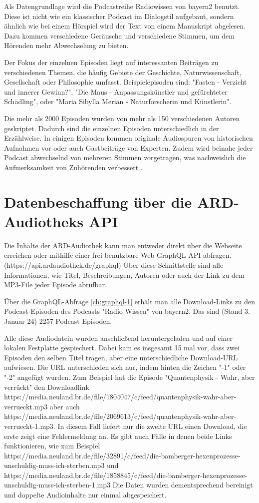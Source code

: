 Als Datengrundlage wird die Podcastreihe Radiowissen von bayern2 benutzt. 
Diese ist nicht wie ein klassischer Podcast im Dialogstil aufgebaut, sondern ähnlich wie bei einem Hörspiel wird der Text von einem Manuskript abgelesen. 
Dazu kommen verschiedene Geräusche und verschiedene Stimmen, um dem Hörenden mehr Abwechselung zu bieten.

Der Fokus der einzelnen Episoden liegt auf interessanten Beiträgen zu verschiedenen Themen, die häufig Gebiete der Geschichte, Naturwissenschaft, Gesellschaft oder Philosophie umfasst.
Beispielepisoden sind: "Fasten - Verzicht und innerer Gewinn?", "Die Maus - Anpassungskünstler und gefürchteter Schädling", oder "Maria Sibylla Merian - Naturforscherin und Künstlerin".

Die mehr als 2000 Episoden wurden von mehr als 150 verschiedenen Autoren geskriptet.
Dadurch sind die einzelnen Episoden unterschiedlich in der Erzählweise.
In einigen Episoden kommen originale Audiospuren von historischen Aufnahmen vor oder auch  Gastbeiträge von Experten. Zudem wird beinahe jeder Podcast abwechselnd von mehreren Stimmen vorgetragen, was nachweislich die Aufmerksamkeit von Zuhörenden verbessert \cite{kang2012}.

\section{Datenbeschaffung über die ARD-Audiotheks API}

Die Inhalte der ARD-Audiothek kann man entweder direkt über die Webseite erreichen oder mithilfe einer frei benutzbare Web-GraphQL API abfragen.
(https://api.ardaudiothek.de/graphql) 
Über diese Schnittstelle sind alle Informationen, wie Titel, Beschreibungen, Autoren oder auch der Link zu dem MP3-File jeder Episode abrufbar.

Über die GraphQL-Abfrage \autoref{ch:graphql-1} erhält man alle Download-Links zu den Podcast-Episoden des Podcasts "Radio Wissen" von bayern2.
Das sind (Stand 3. Januar 24) 2257 Podcast Episoden.

Alle diese Audiodatein wurden anschließend heruntergeladen und auf einer lokalen Festplatte gespiechert.
Dabei kam es insgesamt 15 mal vor, dass zwei Episoden den selben Titel tragen, aber eine unterschiedliche Download-URL aufwiesen.
Die URL unterschieden sich nur, indem hinten die Zeichen "-1" oder "-2" angefügt wurden.
Zum Beispiel hat die Episode "Quantenphysik - Wahr, aber verrückt" den Downloadlink https://media.neuland.br.de/file/1804047/c/feed/quantenphysik-wahr-aber-verrueckt.mp3 aber auch https://media.neuland.br.de/file/2069613/c/feed/quantenphysik-wahr-aber-verrueckt-1.mp3.
In diesem Fall liefert nur die zweite URL einen Download, die erste zeigt eine Fehlermeldung an.
Es gibt auch Fälle in denen beide Links funktionieren, wie zum Beispiel 
https://media.neuland.br.de/file/32891/c/feed/die-bamberger-hexenprozesse-unschuldig-muss-ich-sterben.mp3 und
https://media.neuland.br.de/file/1858845/c/feed/die-bamberger-hexenprozesse-unschuldig-muss-ich-sterben-1.mp3   
Die Daten wurden dementsprechend bereinigt und doppelte Audioinhalte nur einmal abgespeichert.

